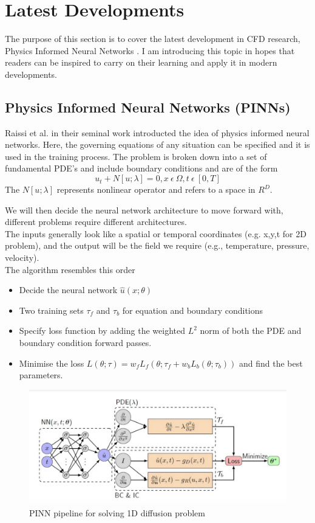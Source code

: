 \documentclass[12pt]{article}
\begin{document}
\section{Latest Developments}
The purpose of this section is to cover the latest development in CFD research, Physics Informed Neural Networks \cite{bib14}. I am introducing this topic in hopes that readers can be inspired to carry on their learning and apply it in modern developments. 
\subsection{Physics Informed Neural Networks (PINNs)}
 Raissi et al. \cite{bib14} in their seminal work introducted the idea of physics informed neural networks. Here, the governing equations of any situation can be specified and it is used in the training process. The problem is broken down into a set of fundamental PDE's and include boundary conditions and are of the form 
 \begin{equation}
     u_{t} + N[u;\lambda] = 0, x \ \epsilon \ \Omega, t\ \epsilon \ [0, T]
 \end{equation}
The $N[u;\lambda]$ represents nonlinear operator and refers to a space in $R^{D}$. 

We will then decide the neural network architecture to move forward with, different problems require different architectures. \\

The inputs generally look like a spatial or temporal coordinates (e.g. x,y,t for 2D problem), and the output will be the field we require (e.g., temperature, pressure, velocity). \\

The algorithm resembles this order 
\begin{itemize}
    \item Decide the neural network $\hat{u}(x;\theta)$
    \item Two training sets $\tau_{f}$ and $\tau_{b}$ for equation and boundary conditions
    \item Specify loss function by adding the weighted $L^{2}$ norm of both the PDE and boundary condition forward passes.
    \item Minimise the loss $L(\theta ; \tau) = w_f L_f (\theta ; \tau_{f} + w_b L_b (\theta ; \tau_{b}))$ and find the best parameters.
\end{itemize}

\begin{figure}[hbt!]
  \centering
  \includegraphics[width=12cm]{plot17.png}
  \caption{PINN pipeline for solving 1D diffusion problem \label{fig:fig1}}
\end{figure}
\FloatBarrier 

\printbibliography
\end{document}

